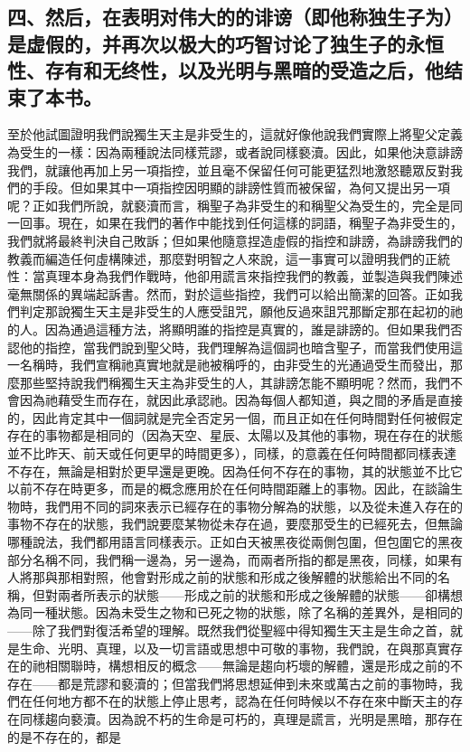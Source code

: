 
\subsection{四、然后，在表明对伟大的的诽谤（即他称独生子为）是虚假的，并再次以极大的巧智讨论了独生子的永恒性、存有和无终性，以及光明与黑暗的受造之后，他结束了本书。}

至於他試圖證明我們說獨生天主是非受生的，這就好像他說我們實際上將聖父定義為受生的一樣：因為兩種說法同樣荒謬，或者說同樣褻瀆。因此，如果他決意誹謗我們，就讓他再加上另一項指控，並且毫不保留任何可能更猛烈地激怒聽眾反對我們的手段。但如果其中一項指控因明顯的誹謗性質而被保留，為何又提出另一項呢？正如我們所說，就褻瀆而言，稱聖子為非受生的和稱聖父為受生的，完全是同一回事。現在，如果在我們的著作中能找到任何這樣的詞語，稱聖子為非受生的，我們就將最終判決自己敗訴；但如果他隨意捏造虛假的指控和誹謗，為誹謗我們的教義而編造任何虛構陳述，那麼對明智之人來說，這一事實可以證明我們的正統性：當真理本身為我們作戰時，他卻用謊言來指控我們的教義，並製造與我們陳述毫無關係的異端起訴書。然而，對於這些指控，我們可以給出簡潔的回答。正如我們判定那說獨生天主是非受生的人應受詛咒，願他反過來詛咒那斷定那在起初的祂的人。因為通過這種方法，將顯明誰的指控是真實的，誰是誹謗的。但如果我們否認他的指控，當我們說到聖父時，我們理解為這個詞也暗含聖子，而當我們使用這一名稱時，我們宣稱祂真實地就是祂被稱呼的，由非受生的光通過受生而發出，那麼那些堅持說我們稱獨生天主為非受生的人，其誹謗怎能不顯明呢？然而，我們不會因為祂藉受生而存在，就因此承認祂。因為每個人都知道，與之間的矛盾是直接的，因此肯定其中一個詞就是完全否定另一個，而且正如在任何時間對任何被假定存在的事物都是相同的（因為天空、星辰、太陽以及其他的事物，現在存在的狀態並不比昨天、前天或任何更早的時間更多），同樣，的意義在任何時間都同樣表達不存在，無論是相對於更早還是更晚。因為任何不存在的事物，其的狀態並不比它以前不存在時更多，而是的概念應用於在任何時間距離上的事物。因此，在談論生物時，我們用不同的詞來表示已經存在的事物分解為的狀態，以及從未進入存在的事物不存在的狀態，我們說要麼某物從未存在過，要麼那受生的已經死去，但無論哪種說法，我們都用語言同樣表示。正如白天被黑夜從兩側包圍，但包圍它的黑夜部分名稱不同，我們稱一邊為，另一邊為，而兩者所指的都是黑夜，同樣，如果有人將那與那相對照，他會對形成之前的狀態和形成之後解體的狀態給出不同的名稱，但對兩者所表示的狀態——形成之前的狀態和形成之後解體的狀態——卻構想為同一種狀態。因為未受生之物和已死之物的狀態，除了名稱的差異外，是相同的——除了我們對復活希望的理解。既然我們從聖經中得知獨生天主是生命之首，就是生命、光明、真理，以及一切言語或思想中可敬的事物，我們說，在與那真實存在的祂相關聯時，構想相反的概念——無論是趨向朽壞的解體，還是形成之前的不存在——都是荒謬和褻瀆的；但當我們將思想延伸到未來或萬古之前的事物時，我們在任何地方都不在的狀態上停止思考，認為在任何時候以不存在來中斷天主的存在同樣趨向褻瀆。因為說不朽的生命是可朽的，真理是謊言，光明是黑暗，那存在的是不存在的，都是